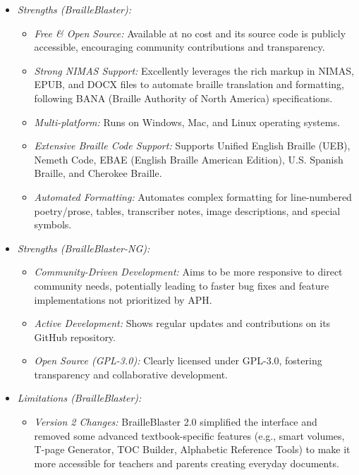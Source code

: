 \begin{itemize}
    \item \emph{Strengths (BrailleBlaster):}
    \begin{itemize}
        \item \emph{Free \& Open Source:} Available at no cost and its source code is publicly accessible, encouraging community contributions and transparency.
        \item \emph{Strong NIMAS Support:} Excellently leverages the rich markup in NIMAS, EPUB, and DOCX files to automate braille translation and formatting, following BANA (Braille Authority of North America) specifications\footnotemark{}.
        \item \emph{Multi-platform:} Runs on Windows, Mac, and Linux operating systems.
        \item \emph{Extensive Braille Code Support:} Supports Unified English Braille (UEB), Nemeth Code, EBAE (English Braille American Edition), U.S. Spanish Braille, and Cherokee Braille.
        \item \emph{Automated Formatting:} Automates complex formatting for line-numbered poetry/prose, tables, transcriber notes, image descriptions, and special symbols.
    \end{itemize}
    \item \emph{Strengths (BrailleBlaster-NG):}
    \begin{itemize}
        \item \emph{Community-Driven Development:} Aims to be more responsive to direct community needs, potentially leading to faster bug fixes and feature implementations not prioritized by APH\footnotemark{}.
        \item \emph{Active Development:} Shows regular updates and contributions on its GitHub repository.
        \item \emph{Open Source (GPL-3.0):} Clearly licensed under GPL-3.0, fostering transparency and collaborative development.
    \end{itemize}
    \item \emph{Limitations (BrailleBlaster):}
    \begin{itemize}
        \item \emph{Version 2 Changes:} BrailleBlaster 2.0 simplified the interface and removed some advanced textbook-specific features (e.g., smart volumes, T-page Generator, TOC Builder, Alphabetic Reference Tools) to make it more accessible for teachers and parents creating everyday documents.

\end{itemize}
\end{itemize}
